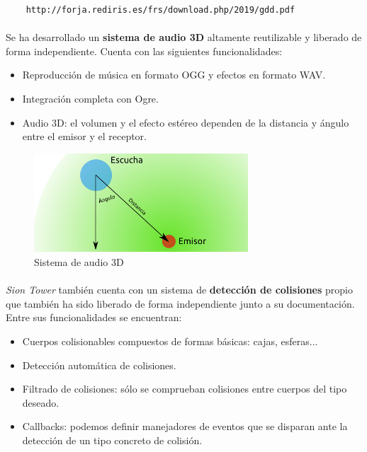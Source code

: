 \documentclass[16pt,spanish]{article}
\def \juego{\emph {Sion Tower} }
\begin{document}
\begin{verbatim}
    http://forja.rediris.es/frs/download.php/2019/gdd.pdf
\end{verbatim}

\paragraph{}
Se ha desarrollado un \textbf{sistema de audio 3D} altamente
reutilizable y liberado de forma independiente. Cuenta con las siguientes
funcionalidades:

\begin{itemize}
    \item Reproducción de música en formato OGG y efectos en formato WAV.
    \item Integración completa con Ogre.
    \item Audio 3D: el volumen y el efecto estéreo dependen de la distancia
    y ángulo entre el emisor y el receptor.
\end{itemize}

\begin{figure}[H]
    \centering
        \includegraphics[width=8cm]{img/audio3d.png} 
    \caption{Sistema de audio 3D}
    \label{img:audio3d}
\end{figure}

\paragraph{}
\juego también cuenta con un sistema de \textbf{detección de colisiones} propio
que también ha sido liberado de forma independiente junto a su documentación.
Entre sus funcionalidades se encuentran:

\begin{itemize}
    \item Cuerpos colisionables compuestos de formas básicas: cajas, esferas...
    \item Detección automática de colisiones.
    \item Filtrado de colisiones: sólo se comprueban colisiones entre cuerpos
    del tipo deseado.
    \item Callbacks: podemos definir manejadores de eventos que se disparan
    ante la detección de un tipo concreto de colisión.
\end{itemize}
\end{document}
